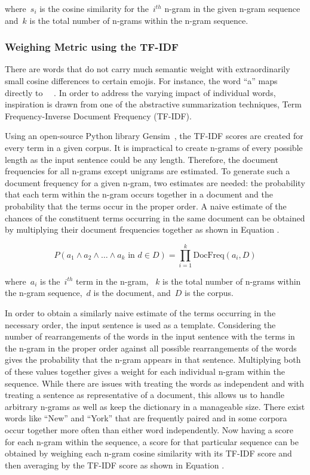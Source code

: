 \documentclass{article}[10]
\newcommand*{\img}[1]{%
  \raisebox{-.3\baselineskip}{%
    \texttt{[image: \#1]}%
  }%
}
\begin{document}
where~\(s_{i}\) is the cosine similarity for the~\(i^{th}\) n-gram in the given n-gram sequence and~\(k\) is the total number of n-grams within the n-gram sequence.

\subsubsection{Weighing Metric using the TF-IDF\label{sec:TF-IDFWeighing}}

There are words that do not carry much semantic weight with extraordinarily small cosine differences to certain emojis. For instance, the word ``a'' maps directly to~~\img{emojis/1f4af.png}. In order to address the varying impact of individual words, inspiration is drawn from one of the abstractive summarization techniques, Term Frequency-Inverse Document Frequency (TF-IDF).

Using an open-source Python library Gensim~\cite{gensim}, the TF-IDF scores are created for every term in a given corpus. It is impractical to create n-grams of every possible length as the input sentence could be any length. Therefore, the document frequencies for all n-grams except unigrams are estimated. To generate such a document frequency for a given n-gram, two estimates are needed: the probability that each term within the n-gram occurs together in a document and the probability that the terms occur in the proper order. A naive estimate of the chances of the constituent terms occurring in the same document can be obtained by multiplying their document frequencies together as shown in Equation .

\begin{equation}
  P(a_{1} \land a_{2} \land \ldots \land a_{k} \textrm{ in } d \in D) = \prod_{i=1}^{k}\textrm{DocFreq}(a_{i}, D) \label{eq:TF-IDFWeighing}
\end{equation}

where~\(a_{i}\) is the~\(i^{th}\) term in the n-gram, ~\(k\) is the total number of n-grams within the n-gram sequence,~\(d\) is the document, and~\(D\) is the corpus.

In order to obtain a similarly naive estimate of the terms occurring in the necessary order, the input sentence is used as a template. Considering the number of rearrangements of the words in the input sentence with the terms in the n-gram in the proper order against all possible rearrangements of the words gives the probability that the n-gram appears in that sentence. Multiplying both of these values together gives a weight for each individual n-gram within the sequence. While there are issues with treating the words as independent and with treating a sentence as representative of a document, this allows us to handle arbitrary n-grams as well as keep the dictionary in a manageable size. There exist words like ``New'' and ``York'' that are frequently paired and in some corpora occur together more often than either word independently. Now having a score for each n-gram within the sequence, a score for that particular sequence can be obtained by weighing each n-gram cosine similarity with its TF-IDF score and then averaging by the TF-IDF score as shown in Equation .
\end{document}
